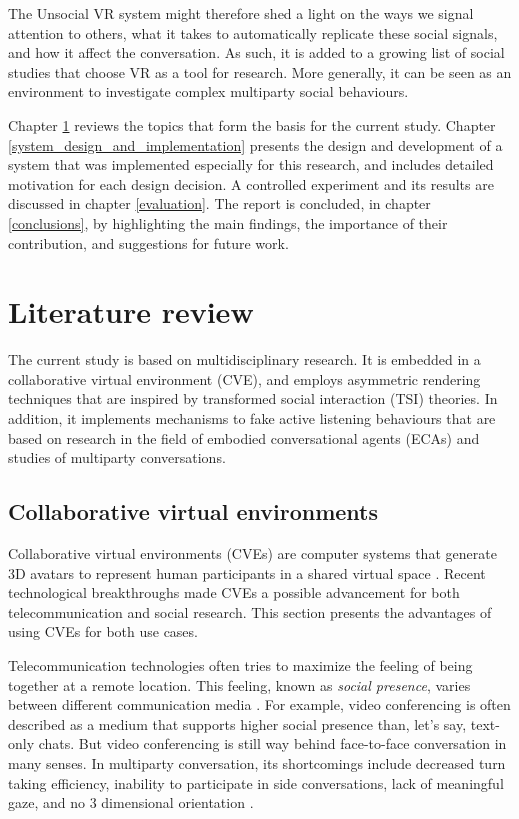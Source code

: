 \documentclass[]{simple-thesis}
\begin{document}
The Unsocial VR system might therefore shed a light on the ways we signal attention to others, what it takes to automatically replicate these social signals, and how it affect the conversation.
As such, it is added to a growing list of social studies that choose VR as a tool for research.
More generally, it can be seen as an environment to investigate complex multiparty social behaviours.

Chapter \ref{literature_review} reviews the topics that form the basis for the current study.
Chapter \ref{system_design_and_implementation} presents the design and development of a system that was implemented especially for this research, and includes detailed motivation for each design decision.
A controlled experiment and its results are discussed in chapter \ref{evaluation}.
The report is concluded, in chapter \ref{conclusions}, by highlighting the main findings, the importance of their contribution, and suggestions for future work.


\chapter{Literature review}\label{literature_review}

The current study is based on multidisciplinary research.
It is embedded in a collaborative virtual environment (CVE), and employs asymmetric rendering techniques that are inspired by transformed social interaction (TSI) theories.
In addition, it implements mechanisms to fake active listening behaviours that are based on research in the field of embodied conversational agents (ECAs) and studies of multiparty conversations.

\section{Collaborative virtual environments}

Collaborative virtual environments (CVEs) are computer systems that generate 3D avatars to represent human participants in a shared virtual space \citep{Bailenson2004}.
Recent technological breakthroughs made CVEs a possible advancement for both telecommunication and social research.
This section presents the advantages of using CVEs for both use cases.

Telecommunication technologies often tries to maximize the feeling of being together at a remote location.
This feeling, known as \textit{social presence}, varies between different communication media \citep{Short1976}.
For example, video conferencing is often described as a medium that supports higher social presence than, let's say, text-only chats.
But video conferencing is still way behind face-to-face conversation in many senses.
In multiparty conversation, its shortcomings include decreased turn taking efficiency, inability to participate in side conversations, lack of meaningful gaze, and no 3 dimensional orientation \citep{Isaacs1994}.
\end{document}
